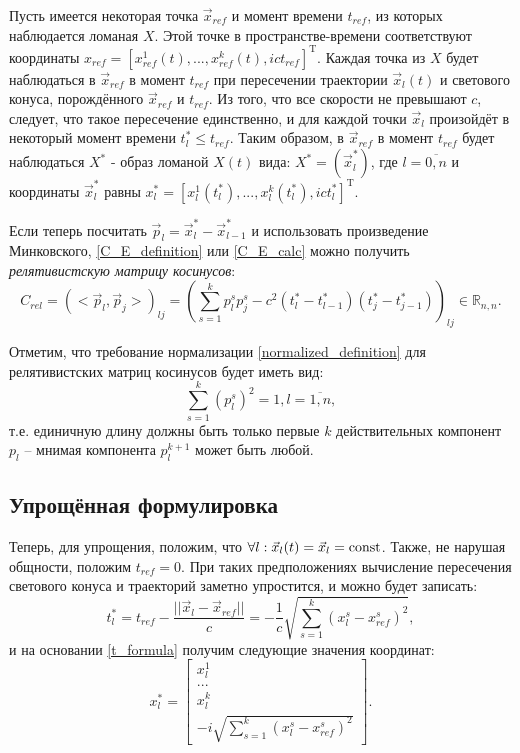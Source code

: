 Пусть имеется некоторая точка $\vec{x}_{ref}$ и момент времени $t_{ref}$, из которых наблюдается ломаная $X$. Этой точке в пространстве-времени соответствуют координаты $x_{ref} = [x^1_{ref}(t), ..., x^k_{ref}(t), ict_{ref}]^\mathrm{T}$. Каждая точка из $X$ будет наблюдаться в $\vec{x}_{ref}$ в момент $t_{ref}$ при пересечении траектории $\vec{x}_l(t)$ и светового конуса, порождённого $\vec{x}_{ref}$ и $t_{ref}$. Из того, что все скорости не превышают $c$, следует, что такое пересечение единственно, и для каждой точки $\vec{x}_l$ произойдёт в некоторый момент времени $t^*_l \le t_{ref}$. Таким образом, в $\vec{x}_{ref}$ в момент $t_{ref}$ будет наблюдаться $X^*$ - образ ломаной $X(t)$ вида:
$X^* = (\vec{x}^*_l)$, где $l = \overline{0,n}$ и координаты $\vec{x}^*_l$ равны $x^*_l = [x^1_l(t^*_l), ..., x^k_l(t^*_l), ict^*_l]^\mathrm{T}$.

Если теперь посчитать $\vec{p}_l = \vec{x}^*_l - \vec{x}^*_{l-1}$ и использовать произведение Минковского, \ref{C_E_definition} или \ref{C_E_calc} можно получить \textit{релятивистскую матрицу косинусов}:
\begin{equation}
	C_{rel} = {(<\vec{p}_{l}, \vec{p}_{j}>)}_{lj} = {\left(\sum_{s=1}^{k} p^s_l p^s_j - c^2(t^*_l - t^*_{l-1})(t^*_j - t^*_{j-1})\right)}_{lj} \in \mathbb{R}_{n,n}.
	\label{C_rel_definition}
\end{equation}

Отметим, что требование нормализации \ref{normalized_definition} для релятивистских матриц косинусов будет иметь вид:
 \begin{equation}
	\sum_{s=1}^{k} {(p^s_l)}^2 = 1, l = \overline{1,n},
	\label{normalized_definition_rel}
\end{equation}
т.е. единичную длину должны быть только первые $k$ действительных компонент $p_l$ -- мнимая компонента $p^{k+1}_l$ может быть любой.

\subsection{Упрощённая формулировка}
Теперь, для упрощения, положим, что $\forall{l}: \vec{x}_l(t) = \vec{x}_l = \operatorname{const}$. Также, не нарушая общности, положим $t_{ref} = 0$. При таких предположениях вычисление пересечения светового конуса и траекторий заметно упростится, и можно будет записать:
\begin{equation}
	t^*_l = t_{ref} - \frac{||\vec{x}_l - \vec{x}_{ref}||}{c} = -\frac{1}{c}\sqrt{\sum_{s=1}^{k}(x^s_l - x^s_{ref})^2},
	\label{t_formula}
\end{equation}
и на основании \ref{t_formula} получим следующие значения координат:
\begin{equation}
	x^*_l = \begin{bmatrix} x^1_l \\ ... \\ x^k_l \\ -i\sqrt{\sum_{s=1}^{k}(x^s_l - x^s_{ref})^2} \end{bmatrix}.
	\label{x_formula}
\end{equation}

